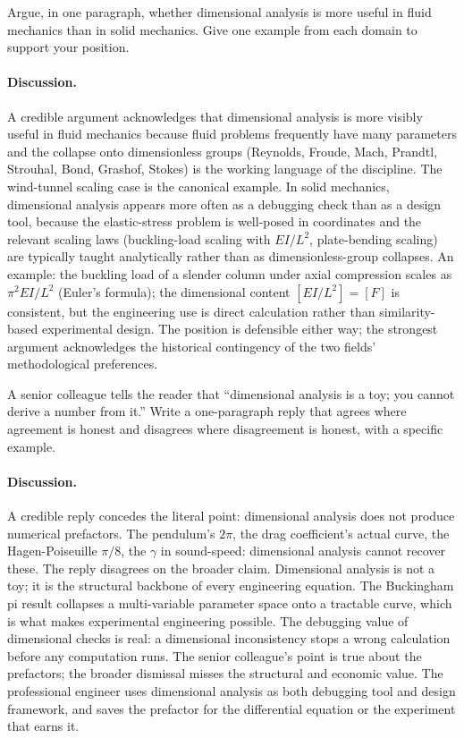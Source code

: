 \begin{exercise}
Argue, in one paragraph, whether dimensional analysis is more useful
in fluid mechanics than in solid mechanics. Give one example from
each domain to support your position.

\paragraph{Discussion.} A credible argument acknowledges that
dimensional analysis is more visibly useful in fluid mechanics
because fluid problems frequently have many parameters and the
collapse onto dimensionless groups (Reynolds, Froude, Mach, Prandtl,
Strouhal, Bond, Grashof, Stokes) is the working language of the
discipline. The wind-tunnel scaling case is the canonical example.
In solid mechanics, dimensional analysis appears more often as a
debugging check than as a design tool, because the elastic-stress
problem is well-posed in coordinates and the relevant scaling laws
(buckling-load scaling with $EI/L^{2}$, plate-bending scaling) are
typically taught analytically rather than as dimensionless-group
collapses. An example: the buckling load of a slender column under
axial compression scales as $\pi^{2} EI / L^{2}$ (Euler's
formula); the dimensional content $[EI/L^{2}] = [F]$ is consistent,
but the engineering use is direct calculation rather than
similarity-based experimental design. The position is defensible
either way; the strongest argument acknowledges the historical
contingency of the two fields' methodological preferences.
\end{exercise}

\begin{exercise}
A senior colleague tells the reader that ``dimensional analysis is a
toy; you cannot derive a number from it.'' Write a one-paragraph
reply that agrees where agreement is honest and disagrees where
disagreement is honest, with a specific example.

\paragraph{Discussion.} A credible reply concedes the literal point:
dimensional analysis does not produce numerical prefactors. The
pendulum's $2\pi$, the drag coefficient's actual curve, the
Hagen-Poiseuille $\pi/8$, the $\gamma$ in sound-speed: dimensional
analysis cannot recover these. The reply disagrees on the broader
claim. Dimensional analysis is not a toy; it is the structural
backbone of every engineering equation. The Buckingham pi result
collapses a multi-variable parameter space onto a tractable curve,
which is what makes experimental engineering possible. The
debugging value of dimensional checks is real: a dimensional
inconsistency stops a wrong calculation before any computation
runs. The senior colleague's point is true about the prefactors;
the broader dismissal misses the structural and economic value.
The professional engineer uses dimensional analysis as both
debugging tool and design framework, and saves the prefactor for
the differential equation or the experiment that earns it.
\end{exercise}
